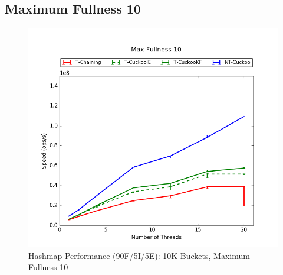 \subsection{Maximum Fullness 10}

\begin{figure}[H]
    \centering
	\begin{minipage}{0.5\textwidth}\includegraphics[width=\textwidth]{maps/10HM10K:F90,I5,E5.png} 
    \end{minipage}
	\begin{minipage}{0.4\textwidth}
    
    \end{minipage}
    \caption{Hashmap Performance (90F/5I/5E): 10K Buckets, Maximum Fullness 10}
\end{figure}

